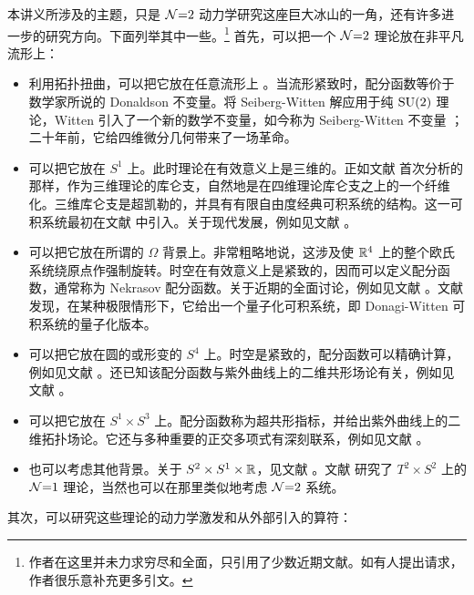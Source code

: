 本讲义所涉及的主题，只是 $\mathcal{N}{=}2$ 动力学研究这座巨大冰山的一角，还有许多进一步的研究方向。下面列举其中一些。\footnote{作者在这里并未力求穷尽和全面，只引用了少数近期文献。如有人提出请求，作者很乐意补充更多引文。} 首先，可以把一个 $\mathcal{N}{=}2$ 理论放在非平凡流形上：
\begin{itemize}
\item 利用拓扑扭曲，可以把它放在任意流形上 \cite{Witten:1988ze}。当流形紧致时，配分函数等价于数学家所说的 Donaldson 不变量。将 Seiberg-Witten 解应用于纯 $\mathop{\mathrm{SU}}(2)$ 理论，Witten 引入了一个新的数学不变量，如今称为 Seiberg-Witten 不变量 \cite{Witten:1994cg}；二十年前，它给四维微分几何带来了一场革命。
\item 可以把它放在 $S^1$ 上。此时理论在有效意义上是三维的。正如文献 \cite{Seiberg:1996nz} 首次分析的那样，作为三维理论的库仑支，自然地是在四维理论库仑支之上的一个纤维化。三维库仑支是超凯勒的，并具有有限自由度经典可积系统的结构。这一可积系统最初在文献 \cite{Donagi:1995cf} 中引入。关于现代发展，例如见文献 \cite{Gaiotto:2008cd}。
\item 可以把它放在所谓的 $\Omega$ 背景上。非常粗略地说，这涉及使 $\mathbb{R}^4$ 上的整个欧氏系统绕原点作强制旋转。时空在有效意义上是紧致的，因而可以定义配分函数，通常称为 Nekrasov 配分函数。关于近期的全面讨论，例如见文献 \cite{Nekrasov:2012xe}。文献 \cite{Nekrasov:2009rc} 发现，在某种极限情形下，它给出一个量子化可积系统，即 Donagi-Witten 可积系统的量子化版本。
\item 可以把它放在圆的或形变的 $S^4$ 上。时空是紧致的，配分函数可以精确计算，例如见文献 \cite{Pestun:2007rz,Hama:2012bg,Nosaka:2013cpa}。还已知该配分函数与紫外曲线上的二维共形场论有关，例如见文献 \cite{Alday:2009aq,Wyllard:2009hg}。
\item 可以把它放在 $S^1\times S^3$ 上。配分函数称为超共形指标，并给出紫外曲线上的二维拓扑场论。它还与多种重要的正交多项式有深刻联系，例如见文献 \cite{Gadde:2011uv,Gaiotto:2012xa}。
\item 也可以考虑其他背景。关于 $S^2\times S^1\times\mathbb{R}$，见文献 \cite{Luo:2013nxa}。文献 \cite{Closset:2013sxa} 研究了 $T^2\times S^2$ 上的 $\mathcal{N}{=}1$ 理论，当然也可以在那里类似地考虑 $\mathcal{N}{=}2$ 系统。
\end{itemize}
其次，可以研究这些理论的动力学激发和从外部引入的算符：
